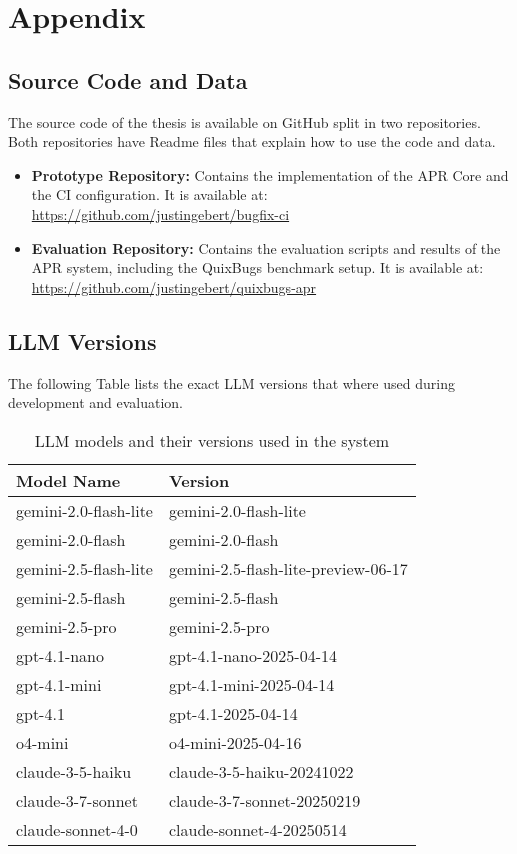 \appendix

\chapter{Appendix} \label{chapter:appendix}

\section{Source Code and Data}
The source code of the thesis is available on GitHub split in two repositories. Both repositories have Readme files that explain how to use the code and data. 
\begin{itemize}
    \item \textbf{Prototype Repository:} Contains the implementation of the APR Core and the CI configuration. It is available at: \url{https://github.com/justingebert/bugfix-ci}
    \item \textbf{Evaluation Repository:} Contains the evaluation scripts and results of the APR system, including the QuixBugs benchmark setup. It is available at: \url{https://github.com/justingebert/quixbugs-apr}
\end{itemize}


\section{LLM Versions}
The following Table lists the exact LLM versions that where used during development and evaluation. 
\begin{longtable}{p{5cm} | p{6cm}}
    \caption{LLM models and their versions used in the system} \label{table:llm_versions} \\
    \hline
    \textbf{Model Name} & \textbf{Version} \\
    \hline
    \endfirsthead
    \hline
    \endfoot
    gemini-2.0-flash-lite    & gemini-2.0-flash-lite \\
    gemini-2.0-flash         & gemini-2.0-flash \\
    gemini-2.5-flash-lite & gemini-2.5-flash-lite-preview-06-17 \\
    gemini-2.5-flash         &  gemini-2.5-flash\\
    gemini-2.5-pro           & gemini-2.5-pro \\
    gpt-4.1-nano             & gpt-4.1-nano-2025-04-14 \\
    gpt-4.1-mini             & gpt-4.1-mini-2025-04-14 \\
    gpt-4.1                  & gpt-4.1-2025-04-14 \\
    o4-mini                  & o4-mini-2025-04-16 \\
    claude-3-5-haiku         & claude-3-5-haiku-20241022 \\
    claude-3-7-sonnet        & claude-3-7-sonnet-20250219 \\
    claude-sonnet-4-0        & claude-sonnet-4-20250514 \\
    \hline
\end{longtable}

